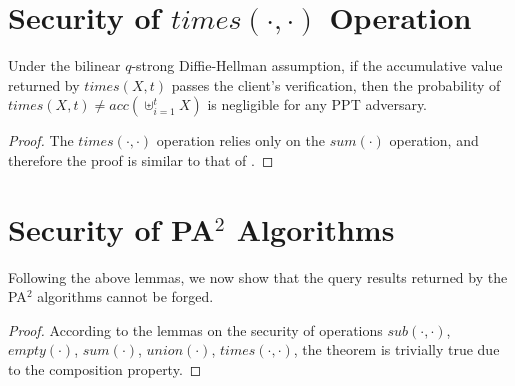 \section{Security of $times(\cdot, \cdot)$ Operation}

\begin{lemma}\label{lem:aggregate-queries:times}
  Under the bilinear $q$-strong Diffie-Hellman assumption, if the accumulative value returned by $times(X,t)$ passes the client's verification, then the probability of $times(X,t) \neq acc(\uplus_{i=1}^t X)$ is negligible for any PPT adversary.
\end{lemma}
\begin{proof}
  The $times(\cdot, \cdot)$ operation relies only on the $sum(\cdot)$ operation, and therefore the proof is similar to that of .
\end{proof}

\section{Security of PA$^2$ Algorithms}

Following the above lemmas, we now show that the query results returned by the PA$^2$ algorithms cannot be forged.
\aggregatesecuritytheorem*

\begin{proof}
  According to the lemmas on the security of operations $sub(\cdot,\cdot)$, $empty(\cdot)$, $sum(\cdot)$, $union(\cdot)$, $times(\cdot,\cdot)$, the theorem is trivially true due to the composition property.
\end{proof}

